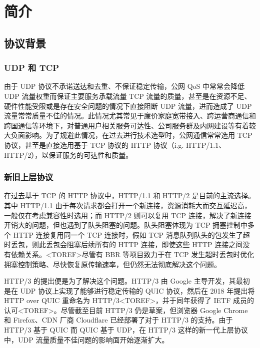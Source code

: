 

\chapter{简介}

\section{协议背景}

\subsection{UDP 和 TCP}

由于 UDP 协议不承诺送达和去重\cite{rfc768}、不保证稳定传输，公网 QoS 中常常会降低 UDP 流量权重而保证主要服务承载流量 TCP 流量的质量，甚至是在资源不足、硬件性能受限或是存在安全问题的情况下直接阻断 UDP 流量，进而造成了 UDP 流量常常质量不佳的情况。此情况尤其常见于廉价家庭宽带接入、跨运营商通信和跨国通信等环境下，对普通用户相关服务可达性、公司服务群及内网建设等有着较大负面影响。为了规避此情况，在过去进行技术选型时，公网通信常常选用 TCP 协议，甚至是直接选用基于 TCP 协议的 HTTP 协议（i.g. HTTP/1.1、HTTP/2），以保证服务的可达性和质量。

\subsection{新旧上层协议}

在过去基于 TCP 的 HTTP 协议中，HTTP/1.1 和 HTTP/2 是目前的主流选择。其中 HTTP/1.1 由于每次请求都会打开一个新连接，资源消耗大而交互延迟高，一般仅在考虑兼容性时选用；而 HTTP/2 则可以复用 TCP 连接，解决了新连接开销大的问题，但也遇到了队头阻塞的问题。队头阻塞体现为 TCP 拥塞控制中多个 HTTP 连接复用同一个 TCP 连接时，假如 TCP 消息队列队头的包发生了超时丢包，则此丢包会阻塞后续所有的 HTTP 连接，即使这些 HTTP 连接之间没有依赖关系。<TOREF>尽管有 BBR\cite{45646} 等项目致力于在 TCP 发生超时丢包时优化拥塞控制策略、尽快恢复原传输速率，但仍然无法彻底解决这个问题。

HTTP/3 的提出便是为了解决这个问题。HTTP/3 由 Google 主导开发，其最初是在 UDP 协议上实现了能够进行稳定传输的 QUIC 协议，然后在 2018 年提出将 HTTP over QUIC 重命名为 HTTP/3<TOREF>，并于同年获得了 IETF 成员的认可<TOREF>。尽管截至目前 HTTP/3 仍是草案\cite{ietf-quic-http-34}，但浏览器 Google Chrome 和 Firefox、CDN 厂商 Cloudflare 已经部署了对于 HTTP/3 的支持。由于 HTTP/3 基于 QUIC 而 QUIC 基于 UDP，在 HTTP/3 这样的新一代上层协议中，UDP 流量质量不佳问题的影响面开始逐渐扩大。

